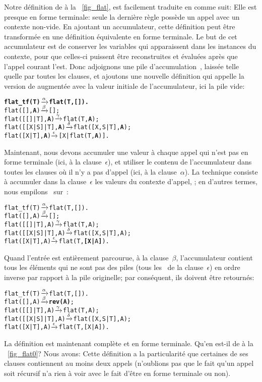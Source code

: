 Notre définition de  à la \fig~\vref{fig_flat}, est
facilement traduite en \Erlang comme suit: 
Elle est presque en forme terminale: seule la dernière règle possède
un appel avec un contexte non-vide. En ajoutant un accumulateur, cette
définition peut être transformée en une définition équivalente en
forme terminale. Le but de cet accumulateur est de conserver les
variables qui apparaissent dans les instances du contexte, pour que
celles-ci puissent être reconstruites et évaluées après que l'appel
courant l'est. Donc adjoignons une pile d'accumulation~,
laissée telle quelle par toutes les clauses, et ajoutons une nouvelle
définition  qui appelle la version de
 augmentée avec la valeur initiale de l'accumulateur,
ici la pile vide:
\begin{alltt}
\textbf{flat_tf(T)        \(\xrightarrow{\smash{\alpha}}\) flat(T,[]).}
flat(       [],\textbf{A}) \(\xrightarrow{\smash{\beta}}\) [];\hfill% A \emph{inutile pour le moment}
flat(   [[]|T],\textbf{A}) \(\xrightarrow{\smash{\gamma}}\) flat(T,\textbf{A});
flat([[X|S]|T],\textbf{A}) \(\xrightarrow{\smash{\delta}}\) flat([X,S|T],\textbf{A});
flat(    [X|T],\textbf{A}) \(\xrightarrow{\smash{\epsilon}}\) [X|flat(T,\textbf{A})].
\end{alltt}
Maintenant, nous devons accumuler une valeur à chaque appel qui n'est
pas en forme terminale (ici, à la clause~\(\epsilon\)), et utiliser le
contenu de l'accumulateur dans toutes les clauses où il n'y a pas
d'appel (ici, à la clause~\(\alpha\)). La technique consiste à
accumuler dans la clause~\(\epsilon\) les valeurs du contexte d'appel,
\erlcode{[X|\textvisiblespace]}; en d'autres termes, nous
empilons~ sur~:
\begin{alltt}
flat_tf(T)        \(\smashedrightarrow{\alpha}\) flat(T,[]).
flat(       [],A) \(\smashedrightarrow{\beta}\) [];
flat(   [[]|T],A) \(\smashedrightarrow{\gamma}\) flat(T,A);
flat([[X|S]|T],A) \(\smashedrightarrow{\delta}\) flat([X,S|T],A);
flat(    [X|T],A) \(\smashedrightarrow{\epsilon}\) flat(T,\textbf{[X|}A\textbf{]}).\hfill% \emph{Ici}
\end{alltt}
Quand l'entrée est entièrement parcourue, à la clause~\(\beta\),
l'accumulateur contient tous les éléments qui ne sont pas des piles
(tous les~ de la clause~\(\epsilon\)) en ordre inverse par
rapport à la pile originelle; par conséquent, ils doivent être
retournés:
\begin{alltt}
flat_tf(T)        \(\smashedrightarrow{\alpha}\) flat(T,[]).
flat(       [],A) \(\smashedrightarrow{\beta}\) \textbf{rev(A)};
flat(   [[]|T],A) \(\smashedrightarrow{\gamma}\) flat(T,A);
flat([[X|S]|T],A) \(\smashedrightarrow{\delta}\) flat([X,S|T],A);
flat(    [X|T],A) \(\smashedrightarrow{\epsilon}\) flat(T,[X|A]).
\end{alltt}
La définition est maintenant complète et en forme terminale. Qu'en
est-il de  à la \fig~\vref{fig_flat0}? Nous avons:
 Cette définition a la particularité que
certaines de ses clauses contiennent au moins deux appels (n'oublions
pas que le fait qu'un appel soit récursif n'a rien à voir avec le fait
d'être en forme terminale ou non).

